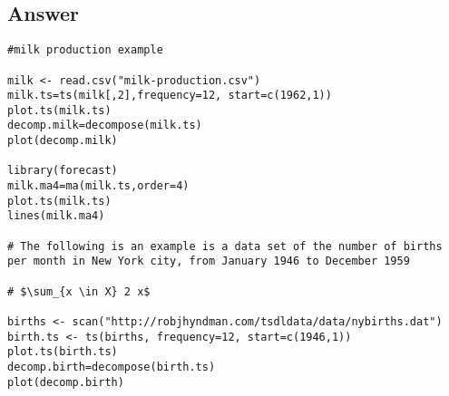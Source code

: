 \documentclass[12pt]{fphw}
\begin{document}
\subsection*{Answer}
\begin{verbatim}
#milk production example

milk <- read.csv("milk-production.csv")
milk.ts=ts(milk[,2],frequency=12, start=c(1962,1))
plot.ts(milk.ts)
decomp.milk=decompose(milk.ts)
plot(decomp.milk)

library(forecast)
milk.ma4=ma(milk.ts,order=4)
plot.ts(milk.ts)
lines(milk.ma4)

# The following is an example is a data set of the number of births per month in New York city, from January 1946 to December 1959

# $\sum_{x \in X} 2 x$

births <- scan("http://robjhyndman.com/tsdldata/data/nybirths.dat")
birth.ts <- ts(births, frequency=12, start=c(1946,1))
plot.ts(birth.ts)
decomp.birth=decompose(birth.ts)
plot(decomp.birth)
\end{verbatim}
\end{document}
